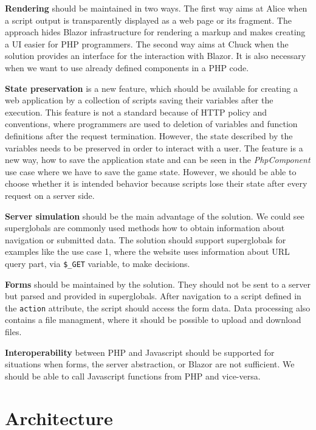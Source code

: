 \par
\textbf{Rendering} should be maintained in two ways.
The first way aims at Alice when a script output is transparently displayed as a web page or its fragment.
The approach hides Blazor infrastructure for rendering a markup and makes creating a UI easier for PHP programmers.
The second way aims at Chuck when the solution provides an interface for the interaction with Blazor.
It is also necessary when we want to use already defined components in a PHP code.
\par
\textbf{State preservation} is a new feature, which should be available for creating a web application by a collection of scripts saving their variables after the execution.
This feature is not a standard because of HTTP policy and conventions, where programmers are used to deletion of variables and function definitions after the request termination.
However, the state described by the variables needs to be preserved in order to interact with a user.
The feature is a new way, how to save the application state and can be seen in the \textit{PhpComponent} use case where we have to save the game state.
However, we should be able to choose whether it is intended behavior because scripts lose their state after every request on a server side.
\par
\textbf{Server simulation} should be the main advantage of the solution.
We could see superglobals are commonly used methods how to obtain information about navigation or submitted data.
The solution should support superglobals for examples like the use case 1, where the website uses information about URL query part, via \texttt{\$\_GET} variable, to make decisions.
\par
\textbf{Forms} should be maintained by the solution. 
They should not be sent to a server but parsed and provided in superglobals. 
After navigation to a script defined in the \texttt{action} attribute, the script should access the form data.
Data processing also contains a file managment, where it should be possible to upload and download files.
\par
\textbf{Interoperability} between PHP and Javascript should be supported for situations when forms, the server abstraction, or Blazor are not sufficient.
We should be able to call Javascript functions from PHP and vice-versa.

\section{Architecture}

